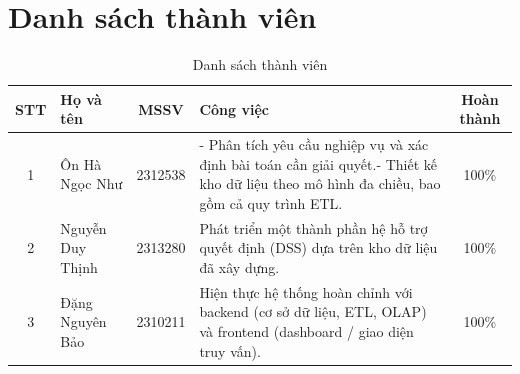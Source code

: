 \section*{Danh sách thành viên}
\begin{table}[h]
\caption{\label{table1}Danh sách thành viên}
\renewcommand{\arraystretch}{1.5}
\begin{tabularx}{\textwidth}{|c|l|c|>{\raggedright\arraybackslash}X|c|}
\hline
\textbf{STT} & \textbf{Họ và tên} & \textbf{MSSV} & \textbf{Công việc} & \textbf{Hoàn thành} \\
\hline 
1 & Ôn Hà Ngọc Như & 2312538 & - Phân tích yêu cầu nghiệp vụ và xác định bài toán cần giải quyết.\newline - Thiết kế kho dữ liệu theo mô hình đa chiều, bao gồm cả quy trình ETL. & 100\% \\
\hline
2 & Nguyễn Duy Thịnh & 2313280 & Phát triển một thành phần hệ hỗ trợ quyết định (DSS) dựa trên kho dữ liệu đã xây dựng. & 100\% \\
\hline
3 & Đặng Nguyên Bảo & 2310211 & Hiện thực hệ thống hoàn chỉnh với backend (cơ sở dữ liệu, ETL, OLAP) và frontend (dashboard / giao diện truy vấn). & 100\% \\
\hline
\end{tabularx}
\end{table}